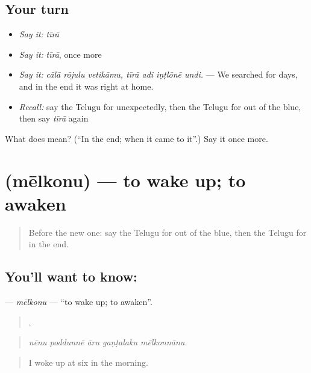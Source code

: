 \subsection*{Your turn}
\begin{itemize}
\raggedright
  \item \emph{Say it:} \emph{tīrā}
  \item \emph{Say it:} \emph{tīrā}, once more
  \item \emph{Say it:} \emph{cālā rōjulu vetikāmu, tīrā adi iṇṭlōnē undi.} — We searched for days, and in the end it was right at home.
  \item \emph{Recall:} say the Telugu for unexpectedly, then the Telugu for out of the blue, then say \emph{tīrā} again
\end{itemize}

\begin{tcolorbox}[breakable,colback=teal!4,colframe=teal!35!black,title={Before you move on}]
What does  mean? (\textquotedblleft{}In the end; when it came to it\textquotedblright{}.) Say it once more.
\end{tcolorbox}
\section[\texorpdfstring{\te{మేల్కొను} (mēlkonu)}{మేల్కొను (mēlkonu)}]{ (mēlkonu) — to wake up; to awaken}

\label{lesson:TE-C340-melkonu}



\begin{quote}
Before the new one: say the Telugu for out of the blue, then the Telugu for in the end.
\end{quote}

\subsection*{You'll want to know: }
\textbf{} — \emph{mēlkonu} — \textquotedblleft{}to wake up; to awaken\textquotedblright{}.

\begin{quote}
    .
\end{quote}

\begin{quote}
\emph{nēnu poddunnē āru gaṇṭalaku mēlkonnānu.}
\end{quote}

\begin{quote}
I woke up at six in the morning.
\end{quote}

